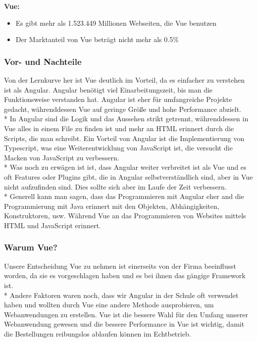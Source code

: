 \textbf{Vue:}
\begin{itemize}
    \item Es gibt mehr als 1.523.449 Millionen Webseiten, die Vue benutzen
    \item Der Marktanteil von Vue beträgt nicht mehr als 0.5\% \cite{AngVsVueSIM}       
\end{itemize}
\subsubsection{Vor- und Nachteile}
Von der Lernkurve her ist Vue deutlich im Vorteil, da es einfacher zu verstehen ist als Angular. Angular benötigt viel Einarbeitungszeit, bis man die Funktionsweise
verstanden hat. Angular ist eher für umfangreiche Projekte gedacht, währenddessen Vue auf geringe Größe und hohe Performance abzielt. \\*
In Angular sind die Logik und das Aussehen strikt getrennt, währenddessen in Vue alles in einem File zu finden ist und mehr an HTML erinnert durch die Scripts, die man schreibt.
Ein Vorteil von Angular ist die Implementierung von Typescript, was eine Weiterentwicklung von JavaScript ist, die versucht die Macken von JavaScript zu verbessern.\\* 
Was noch zu erwägen ist ist, dass Angular weiter verbreitet ist als Vue und es oft Features oder Plugins gibt, die in Angular selbstverständlich sind, aber in Vue nicht aufzufinden sind.
Dies sollte sich aber im Laufe der Zeit verbessern. \\*  Generell kann man sagen, dass das Programmieren mit Angular eher and die Programmierung mit Java erinnert mit den Objekten, Abhängigkeiten,
Konstruktoren, usw. Während Vue an das Programmieren von Websites mittels HTML und JavaScript erinnert. \cite{AngVsVueHOST}
\subsubsection{Warum Vue?}
Unsere Entscheidung Vue zu nehmen ist einerseits von der Firma beeinflusst worden, da sie es vorgeschlagen haben und es bei ihnen das gängige Framework ist.\\*
Andere Faktoren waren noch, dass wir Angular in der Schule oft verwendet haben und wollten durch Vue eine andere Methode ausprobieren, um Webanwendungen zu erstellen.
Vue ist die bessere Wahl für den Umfang unserer Webanwendung gewesen und die bessere Performance in Vue ist wichtig, damit die Bestellungen reibungslos ablaufen können im Echtbetrieb.

